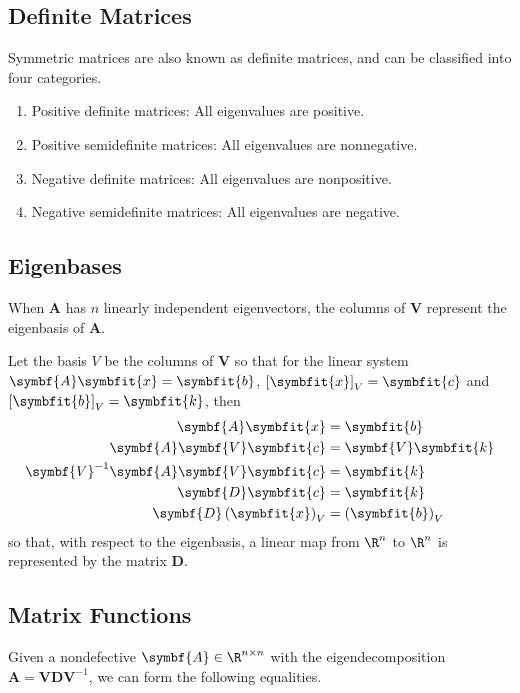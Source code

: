 \documentclass{article}
\begin{document}
\subsection{Definite Matrices}
Symmetric matrices are also known as definite matrices, and can be classified into four categories.
\begin{enumerate}
    \item Positive definite matrices: All eigenvalues are positive.
    \item Positive semidefinite matrices: All eigenvalues are nonnegative.
    \item Negative definite matrices: All eigenvalues are nonpositive.
    \item Negative semidefinite matrices: All eigenvalues are negative.
\end{enumerate}
\subsection{Eigenbases}
When \(\symbf{A}\) has \(n\) linearly independent eigenvectors, the columns of \(\symbf{V}\) represent the eigenbasis of \(\symbf{A}\).

Let the basis \(V\) be the columns of \(\symbf{V}\) so that for the linear system \(\symbf{A}\symbfit{x} = \symbfit{b}\),
\(\left[ \symbfit{x} \right]_V = \symbfit{c}\) and \(\left[ \symbfit{b} \right]_V = \symbfit{k}\),
then
\begin{align*}
    \symbf{A} \symbfit{x}                          & = \symbfit{b}                  \\
    \symbf{A} \symbf{V} \symbfit{c}                & = \symbf{V} \symbfit{k}        \\
    \symbf{V}^{-1} \symbf{A} \symbf{V} \symbfit{c} & = \symbfit{k}                  \\
    \symbf{D} \symbfit{c}                          & = \symbfit{k}                  \\
    \symbf{D} \left( \symbfit{x} \right)_V         & = \left( \symbfit{b} \right)_V
\end{align*}
so that, with respect to the eigenbasis, a linear map from \(\R^n\) to \(\R^n\) is represented by the matrix \(\symbf{D}\).
\subsection{Matrix Functions}
Given a nondefective \(\symbf{A} \in \R^{n \times n}\) with the eigendecomposition \(\symbf{A} = \symbf{V} \symbf{D} \symbf{V}^{-1}\),
we can form the following equalities.
\end{document}
